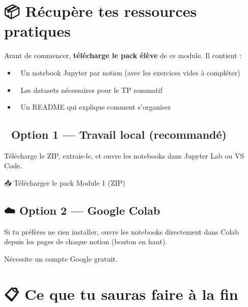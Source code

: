 \documentclass[
  french,
  11pt,
  a4paper,
]{scrbook}
\providecommand{\tightlist}{%
  \setlength{\itemsep}{0pt}\setlength{\parskip}{0pt}}
\begin{document}
\section{📦 Récupère tes ressources
pratiques}\label{ruxe9cupuxe8re-tes-ressources-pratiques}

Avant de commencer, \textbf{télécharge le pack élève} de ce module. Il
contient :

\begin{itemize}
\tightlist
\item
  📓 Un notebook Jupyter par notion (avec les exercices vides à
  compléter)
\item
  📂 Les datasets nécessaires pour le TP sommatif
\item
  📝 Un README qui explique comment s'organiser
\end{itemize}

\subsection{💾 Option 1 --- Travail local
(recommandé)}\label{option-1-travail-local-recommanduxe9}

Télécharge le ZIP, extrais-le, et ouvre les notebooks dans Jupyter Lab
ou VS Code.

📥 Télécharger le pack Module 1 (ZIP)

\subsection{☁️ Option 2 --- Google Colab}\label{option-2-google-colab}

Si tu préfères ne rien installer, ouvre les notebooks directement dans
Colab depuis les pages de chaque notion (bouton en haut).

\begin{tcolorbox}[enhanced jigsaw, arc=.35mm, bottomrule=.15mm, breakable, colback=white, colframe=quarto-callout-note-color-frame, left=2mm, leftrule=.75mm, opacityback=0, rightrule=.15mm, toprule=.15mm]
\begin{minipage}[t]{5.5mm}
\textcolor{quarto-callout-note-color}{\faInfo}
\end{minipage}%
\begin{minipage}[t]{\textwidth - 5.5mm}

Nécessite un compte Google gratuit.

\end{minipage}%
\end{tcolorbox}

\section{📋 Ce que tu sauras faire à la
fin}\label{ce-que-tu-sauras-faire-uxe0-la-fin}
\end{document}
